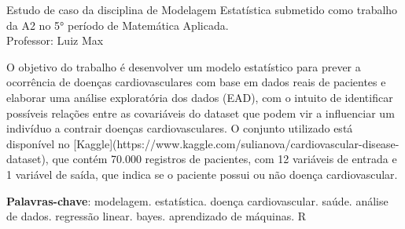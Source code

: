 \documentclass[article,11pt,a4paper,brazil]{abntex2}
\begin{document}
	
	
	\frenchspacing 
	
	
	
	\maketitle
	\thispagestyle{empty}
	\begin{citacao}
		Estudo de caso da disciplina de Modelagem Estatística submetido como trabalho da A2 no 5° período de Matemática Aplicada.\\
		Professor: Luiz Max
	\end{citacao}

\newpage
\thispagestyle{empty}


	
\begin{resumoumacoluna}
		O objetivo do trabalho é desenvolver um modelo estatístico para prever a ocorrência de doenças cardiovasculares com base em dados reais de pacientes e elaborar uma análise exploratória dos dados (EAD), com o intuito de identificar possíveis relações entre as covariáveis do dataset que podem vir a influenciar um indivíduo a contrair doenças cardiovasculares. O conjunto utilizado está disponível no [Kaggle](https://www.kaggle.com/sulianova/cardiovascular-disease-dataset), que contém 70.000 registros de pacientes, com 12 variáveis de entrada e 1 variável de saída, que indica se o paciente possui ou não doença cardiovascular. 
		
		\vspace{\onelineskip}
		
		\noindent
		\textbf{Palavras-chave}: modelagem. estatística. doença cardiovascular. saúde. análise de dados. regressão linear. bayes. aprendizado de máquinas. R
\end{resumoumacoluna}
	
\end{document}
